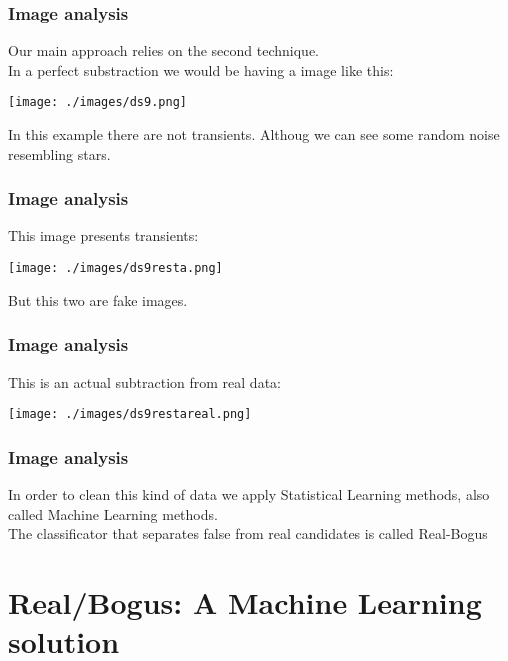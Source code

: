\documentclass[10pt]{beamer}
\begin{document}
\begin{frame}\frametitle{Image analysis}
 Our main approach relies on the second technique. \\
 \pause
 In a perfect substraction we would be having a image like this:
 \begin{center}
 \texttt{[image: ./images/ds9.png]}
\end{center}
\pause
In this example there are not transients.
Althoug we can see some random noise resembling stars.
\end{frame}
\begin{frame}\frametitle{Image analysis}
This image presents transients:
\begin{center}
 \texttt{[image: ./images/ds9resta.png]}
\end{center}
\pause
But this two are fake images.
\end{frame}
\begin{frame}\frametitle{Image analysis}
 This is an actual subtraction from real data:
 \begin{center}
 \texttt{[image: ./images/ds9restareal.png]}
\end{center}
\end{frame}
\begin{frame}\frametitle{Image analysis}
 In order to clean this kind of data we apply Statistical Learning methods, 
 also called Machine Learning methods.\\ \bigskip
 \pause 
 The classificator that separates false from real candidates is called Real-Bogus
\end{frame}

\section{Real/Bogus: A Machine Learning solution}
\frame{\tableofcontents[ 
    currentsection, 
    sectionstyle=show/hide, 
    sectionstyle=show/shaded, 
    ]}
\end{document}
